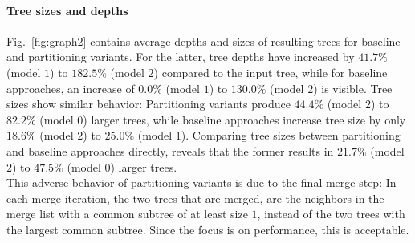 \paragraph{Tree sizes and depths}  
Fig.~\ref{fig:graph2} contains average depths and sizes of resulting trees for baseline and partitioning variants.
For the latter, tree depths have increased by $41.7\%$ (model $1$) to $182.5\%$ (model $2$) compared to the input tree, while for baseline approaches, an increase of $0.0\%$ (model $1$) to $130.0\%$ (model $2$) is visible.
Tree sizes show similar behavior:
Partitioning variants produce $44.4\%$ (model $2$) to $82.2\%$ (model $0$) larger trees, while baseline approaches increase tree size by only $18.6\%$ (model $2$) to $25.0\%$ (model $1$).
Comparing tree sizes between partitioning and baseline approaches directly, reveals that the former results in $21.7\%$ (model $2$) to $47.5\%$ (model $0$) larger trees.
\\
This adverse behavior of partitioning variants is due to the final merge step:
In each merge iteration, 
the two trees that are merged, are the neighbors in the merge list with a common subtree of at least size $1$, 
instead of the two trees with the largest common subtree. 
Since the focus is on performance, this is acceptable.

